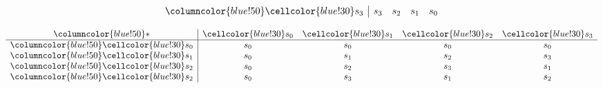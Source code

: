 \documentclass{article}
\begin{document}
\begin{center}
\begin{minipage}{0.23\textwidth}
\[\begin{array}{>{\columncolor{blue!50}}c|cccc}
    \cellcolor{blue!30}s_3 & s_3 & s_2 & s_1 & s_0 \\
    \end{array}
    \]
\end{minipage}%
\hfill
\begin{minipage}{0.23\textwidth}
    \centering
    \renewcommand{\arraystretch}{1.5} 
    \[
    \begin{array}{>{\columncolor{blue!50}}c|cccc}
    * & \cellcolor{blue!30}s_0 & \cellcolor{blue!30}s_1 & \cellcolor{blue!30}s_2 & \cellcolor{blue!30}s_3 \\ \hline
    \cellcolor{blue!30}s_0 & s_0 & s_0 & s_0 & s_0 \\
    \cellcolor{blue!30}s_1 & s_0 & s_1 & s_2 & s_3 \\
    \cellcolor{blue!30}s_2 & s_0 & s_2 & s_3 & s_1 \\
    \cellcolor{blue!30}s_2 & s_0 & s_3 & s_1 & s_2 \\
    \end{array}
    \]
\end{minipage}


\end{center}
\end{document}
